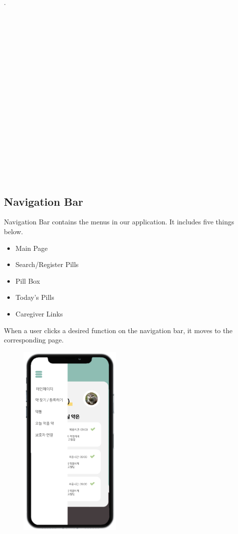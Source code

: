 \documentclass[conference]{IEEEtran}
\begin{document}
.\\
\\
\\
\\
\\
\\
\\
\\
\\
\\
\\
\\
\\
\\
\\
\\
\\
\\
\\

\subsection{Navigation Bar}
Navigation Bar contains the menus in our application. It includes five things below.\\
\begin{itemize}
  \item Main Page
  \item Search/Register Pills
  \item Pill Box
  \item Today's Pills
  \item Caregiver Links
\end{itemize}

When a user clicks a desired function on the navigation bar, it moves to the corresponding page.\\

\begin{figure}[h!]
\centering
\includegraphics[width=5cm]{final_image_folder/navibar.png}
\caption{}
\label{fig:map}
\end{figure} 
\end{document}
